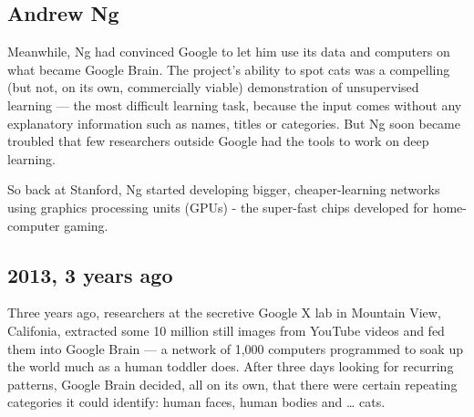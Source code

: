 \subsection{Andrew Ng}
Meanwhile, Ng had convinced Google to let him use its data and computers on what became Google Brain. The project's ability to spot cats was a compelling (but not, on its own, commercially viable) demonstration of unsupervised learning — the most difficult learning task, because the input comes without any explanatory information such as names, titles or categories. But Ng soon became troubled that few researchers outside Google had the tools to work on deep learning.

So back at Stanford, Ng started developing bigger, cheaper-learning networks using graphics processing units (GPUs) - the super-fast chips developed for home-computer gaming. 

\subsection{2013, 3 years ago}
Three years ago, researchers at the secretive Google X lab in Mountain View, Califonia, extracted some 10 million still images from YouTube videos and fed them into Google Brain — a network of 1,000 computers programmed to soak up the world much as a human toddler does. After three days looking for recurring patterns, Google Brain decided, all on its own, that there were certain repeating categories it could identify: human faces, human bodies and … cats.